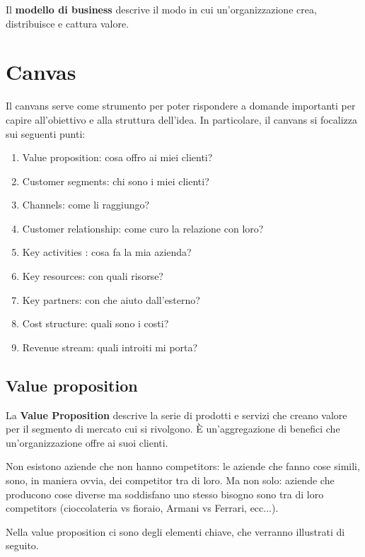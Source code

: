 \begin{definition}
Il \textbf{modello di business} descrive il modo in cui un'organizzazione crea,
distribuisce e cattura valore.
\end{definition}

\section{Canvas}

Il canvans serve come strumento per poter rispondere a domande importanti per
capire all'obiettivo e alla struttura dell'idea. In particolare, il
canvans si focalizza sui seguenti punti:
\begin{enumerate}
 \item Value proposition: cosa offro ai miei clienti?
 \item Customer segments: chi sono i miei clienti?
 \item Channels: come li raggiungo?
 \item Customer relationship: come curo la relazione con loro?
 \item Key activities : cosa fa la mia azienda?
 \item Key resources: con quali risorse?
 \item Key partners: con che aiuto dall'esterno?
 \item Cost structure: quali sono i costi?
 \item Revenue stream: quali introiti mi porta?
\end{enumerate}

\subsection{Value proposition}

\begin{definition}
La \textbf{Value Proposition} descrive la serie di prodotti e servizi che
creano valore per il segmento di mercato cui si rivolgono. È un'aggregazione di
benefici che un'organizzazione offre ai suoi clienti.
\end{definition}

Non esistono aziende che non hanno competitors: le aziende che fanno cose
simili, sono, in maniera ovvia, dei competitor tra di loro. Ma non solo:
aziende che producono cose diverse ma soddisfano uno stesso bisogno sono tra di
loro competitors (cioccolateria vs fioraio, Armani vs Ferrari, ecc...).

Nella value proposition ci sono degli elementi chiave, che verranno illustrati
di seguito.

